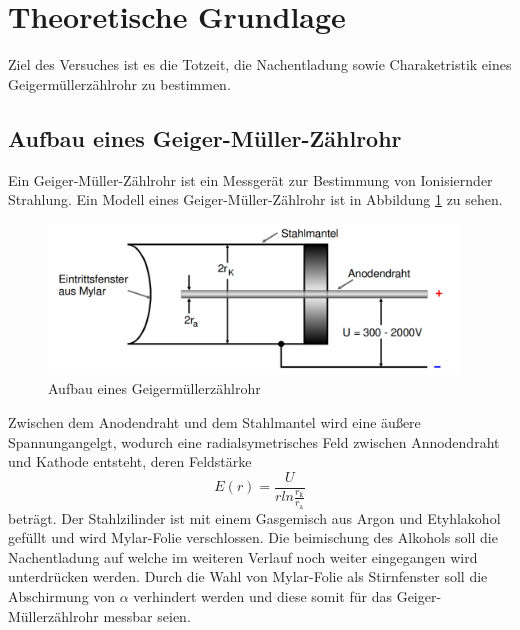 \section{Theoretische Grundlage}
\label{sec:Theorie}
Ziel des Versuches ist es die Totzeit, die Nachentladung sowie Charaketristik eines Geigermüllerzählrohr zu bestimmen.


\subsection{Aufbau eines Geiger-Müller-Zählrohr}
Ein Geiger-Müller-Zählrohr ist ein Messgerät zur Bestimmung von Ionisiernder Strahlung. Ein Modell eines Geiger-Müller-Zählrohr ist in Abbildung \ref{fig:skizze} zu sehen.
\begin{figure}
  \centering
  \includegraphics[height=4cm]{picture/Skizze.pdf}
  \caption{Aufbau eines Geigermüllerzählrohr \cite{sample}}
  \label{fig:skizze}
\end{figure}
Zwischen dem Anodendraht und dem Stahlmantel wird eine äußere Spannungangelgt, wodurch eine radialsymetrisches Feld zwischen Annodendraht und Kathode entsteht, deren Feldstärke
\begin{equation}
  E(r) = \frac{U}{r ln \frac{r_\text{k}}{r_\text{a}}}
  \label{eqn:feld}
\end{equation}
beträgt. Der Stahlzilinder ist mit einem Gasgemisch aus Argon und Etyhlakohol gefüllt und wird Mylar-Folie verschlossen. Die beimischung des Alkohols soll die Nachentladung auf welche im weiteren Verlauf noch weiter eingegangen wird unterdrücken werden. Durch die Wahl von Mylar-Folie als Stirnfenster soll die Abschirmung von $\alpha$ verhindert werden und diese somit für das Geiger-Müllerzählrohr messbar seien.


